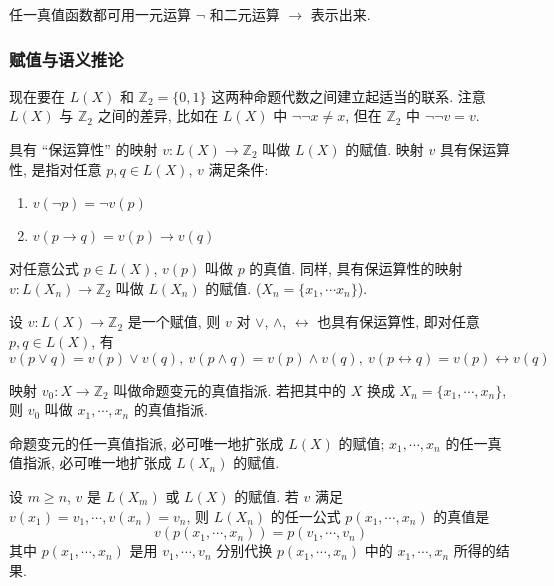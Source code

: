 \documentclass[
    color=black,
    device=normal,
    lang=cn
]{elegantnote}
\begin{document}
\begin{proposition}
    任一真值函数都可用一元运算 $\lnot$ 和二元运算 $\to$ 表示出来.
\end{proposition}

\subsubsection{赋值与语义推论}
现在要在 $L(X)$ 和 $\mathbb{Z}_2=\{0,1\}$ 这两种命题代数之间建立起适当的联系. 注意 $L(X)$ 与 $\mathbb{Z}_2$ 之间的差异, 比如在 $L(X)$ 中 $\lnot \lnot x \neq x$, 但在 $\mathbb{Z}_2$ 中 $\lnot \lnot v = v$.

\begin{definition}[赋值]
    具有 ``保运算性'' 的映射 $v:L(X)\to\mathbb{Z}_2$ 叫做 $L(X)$ 的赋值. 映射 $v$ 具有保运算性, 是指对任意 $p,q\in L(X)$, $v$ 满足条件:
    \begin{enumerate}[(1), topsep = -1em]
        \item $v(\lnot p)=\lnot v(p)$
        \item $v(p\to q)= v(p)\to v(q)$
    \end{enumerate}
    对任意公式 $p\in L(X)$, $v(p)$ 叫做 $p$ 的真值. 同样, 具有保运算性的映射 $v:L(X_n)\to \mathbb{Z}_2$ 叫做 $L(X_n)$ 的赋值. ($X_n=\{x_1,\cdots x_n\}$).
\end{definition}
\begin{proposition}
    设 $v:L(X)\to\mathbb{Z}_2$ 是一个赋值, 则 $v$ 对 $\lor$, $\land$, $\leftrightarrow$ 也具有保运算性, 即对任意 $p,q\in L(X)$, 有
    $$
        v(p\lor q)=v(p)\lor v(q),\ v(p\land q)=v(p)\land v(q),\ v(p\leftrightarrow q)=v(p)\leftrightarrow v(q)
    $$
\end{proposition}
\begin{definition}[真值指派]
    映射 $v_0: X\to\mathbb{Z}_2$ 叫做命题变元的真值指派. 若把其中的 $X$ 换成 $X_n=\{x_1, \cdots, x_n\}$, 则 $v_0$ 叫做 $x_1, \cdots, x_n$ 的真值指派.
\end{definition}
\begin{theorem}
    命题变元的任一真值指派, 必可唯一地扩张成 $L(X)$ 的赋值; $x_1, \cdots, x_n$ 的任一真值指派, 必可唯一地扩张成 $L(X_n)$ 的赋值.
\end{theorem}
\begin{proposition}
    设 $m\geq n$, $v$ 是 $L(X_m)$ 或 $L(X)$ 的赋值. 若 $v$ 满足 $v(x_1)=v_1, \cdots, v(x_n)=v_n$, 则 $L(X_n)$ 的任一公式 $p(x_1, \cdots, x_n)$ 的真值是
    $$
        v(p(x_1, \cdots, x_n))=p(v_1, \cdots, v_n)
    $$
    其中 $p(x_1,\cdots,x_n)$ 是用 $v_1, \cdots, v_n$ 分别代换 $p(x_1, \cdots, x_n)$ 中的 $x_1, \cdots, x_n$ 所得的结果.
\end{proposition}
\end{document}
